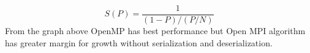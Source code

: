 \documentclass[11pt,a4paper]{article}
\begin{document}
\begin{equation}
S(P) = \dfrac{1}{(1-P)/(P/N)}
\end{equation}
From the graph above OpenMP has best performance but Open MPI algorithm has greater margin for growth without serialization and deserialization.
\begin{figure}[H]
    \centering
\end{figure} 
\begin{figure}[H]
    \centering
    \centering
    \label{fig:example}%
\end{figure}
\end{document}
